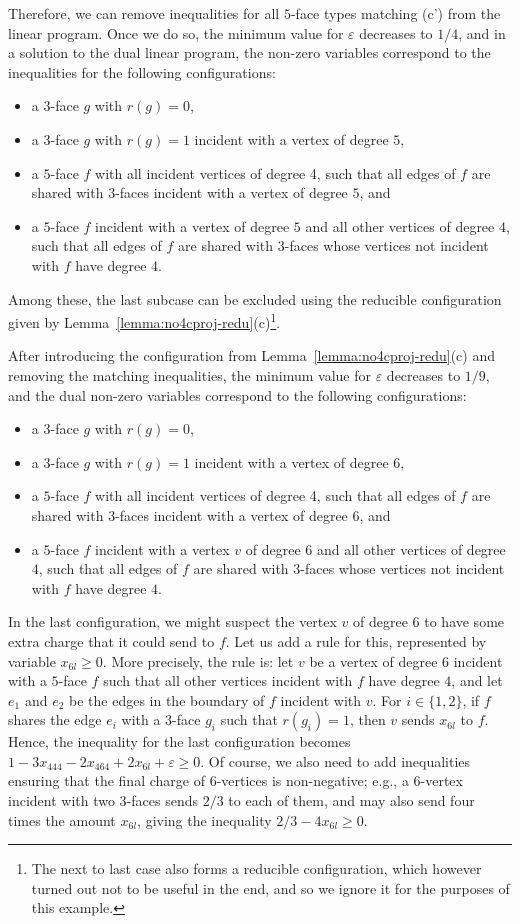 \documentclass[12pt,twoside,openright,a4paper]{book}
\begin{document}
Therefore, we can remove inequalities for all $5$-face types matching (c') from the linear program.
Once we do so, the minimum value for $\varepsilon$ decreases to $1/4$, and in a solution to the dual linear program,
the non-zero variables correspond to the inequalities for the following configurations:
\begin{itemize}
\item a $3$-face $g$ with $r(g)=0$,
\item a $3$-face $g$ with $r(g)=1$ incident with a vertex of degree $5$,
\item a $5$-face $f$ with all incident vertices of degree 4, such that all edges of $f$ are shared with $3$-faces
incident with a vertex of degree $5$, and
\item a $5$-face $f$ incident with a vertex of degree $5$ and all other vertices of degree $4$,
such that all edges of $f$ are shared with $3$-faces whose vertices not incident with $f$ have degree $4$.
\end{itemize}
Among these, the last subcase can be excluded using the reducible configuration given by Lemma~\ref{lemma:no4cproj-redu}(c)\footnote{The next
to last case also forms a reducible configuration, which however turned out not to be useful in the end, and so we ignore it
for the purposes of this example.}.

After introducing the configuration from Lemma~\ref{lemma:no4cproj-redu}(c) and removing the matching inequalities,
the minimum value for $\varepsilon$ decreases to $1/9$, and the dual non-zero variables correspond to the following configurations:
\begin{itemize}
\item a $3$-face $g$ with $r(g)=0$,
\item a $3$-face $g$ with $r(g)=1$ incident with a vertex of degree $6$,
\item a $5$-face $f$ with all incident vertices of degree 4, such that all edges of $f$ are shared with $3$-faces
incident with a vertex of degree $6$, and
\item a $5$-face $f$ incident with a vertex $v$ of degree $6$ and all other vertices of degree $4$,
such that all edges of $f$ are shared with $3$-faces whose vertices not incident with $f$ have degree $4$.
\end{itemize}

In the last configuration, we might suspect the vertex $v$ of degree $6$ to have some extra charge that it could send to $f$.
Let us add a rule for this, represented by variable $x_{6l}\ge 0$.  More precisely, the rule is: let $v$ be a vertex of degree $6$
incident with a $5$-face $f$ such that all other vertices incident with $f$ have degree $4$, and let $e_1$ and $e_2$
be the edges in the boundary of $f$ incident with $v$.  For $i\in\{1,2\}$, if $f$ shares the edge $e_i$ with a $3$-face $g_i$
such that $r(g_i)=1$, then $v$ sends $x_{6l}$ to $f$.  Hence, the inequality for the last configuration becomes
$1-3x_{444}-2x_{464}+2x_{6l}+\varepsilon\ge 0$.  Of course, we also need to add inequalities ensuring that the final charge
of $6$-vertices is non-negative; e.g., a $6$-vertex incident with two $3$-faces sends $2/3$ to each of them, and may also
send four times the amount $x_{6l}$, giving the inequality $2/3-4x_{6l}\ge 0$.
\end{document}
